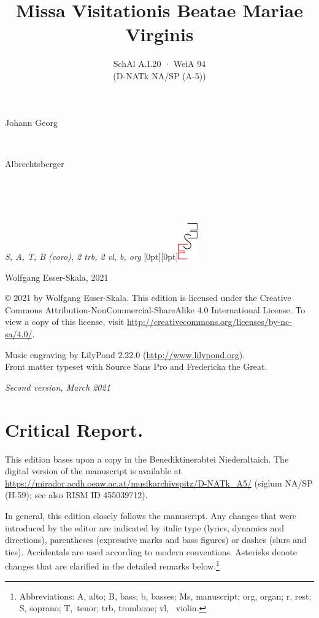 \documentclass[parskip=full]{scrreprt}
\makeatletter
\DeclareRobustCommand{\sbseries}{\fontseries{sb}\selectfont}
\newcommand\fancytitlehead{
	\headingfont%
	\fontsize{65}{65}\selectfont\textcolor{black!80}{\@ifundefined{@shortname}{\@lastname}{\@shortname}.}\\[15pt]%
	\fontsize{50}{50}\selectfont\@ifundefined{@shorttitle}{\@title}{\@shorttitle}.%
}
\def\firstname#1{\def\@firstname{#1}}
\def\lastname#1{\def\@lastname{#1}}
\def\shorttitle#1{\def\@shorttitle{#1}}
\def\instrumentation#1{\def\@instrumentation{#1}}
\def\maketitle{%
\begin{titlepage}%
	\Large%
	{\@titlehead}%
	\vfill%
	{\strut\@firstname}\\%
	{\sbseries\color{oldred}\strut\@lastname}\\%
	{\strut\@namesuffix}%
	\vfill%
	{\sbseries\@title}\\%
	{\@subtitle}\\[\baselineskip]%
	{\itshape\@instrumentation}%
	\vfill%
	{\itshape\@parts}\hspace*{\fill}\raisebox{0pt}[0pt][0pt]{\includegraphics{ees_logo}}%
\end{titlepage}%
}
\newif\ifprintreport\printreportfalse
\makeatother
\begin{document}
\frenchspacing

\titlehead{\fancytitlehead}
\firstname{Johann Georg}
\lastname{Albrechtsberger}
\title{Missa Visitationis Beatae Mariae Virginis}
\shorttitle{Missa Visitationis}
\subtitle{SchAl A.I.20 · WeiA 94\\(D-NATk NA/SP (A-5))}
\instrumentation{S, A, T, B (coro), 2 trb, 2 vl, b, org}
\maketitle


\thispagestyle{empty}

\vspace*{\fill}

\hspace*{1em}Wolfgang Esser-Skala, 2021

© 2021 by Wolfgang Esser-Skala. This edition is licensed under the Creative Commons Attribution-NonCommercial-ShareAlike 4.0 International License. To view a copy of this license, visit \url{http://creativecommons.org/licenses/by-nc-sa/4.0/}. 

Music engraving by LilyPond 2.22.0 (\url{http://www.lilypond.org}).\\
Front matter typeset with Source Sans Pro and Fredericka the Great.

\textit{Second version, March 2021}

\vspace*{2cm}

\ifprintreport
\chapter*{Critical Report.}

This edition bases upon a copy in the Benediktinerabtei Niederaltaich. The digital version of the manuscript is available at \url{https://mirador.acdh.oeaw.ac.at/musikarchivspitz/D-NATk_A5/} (siglum NA/SP (H-59); see also RISM ID 455039712).

In general, this edition closely follows the manuscript. Any changes that were introduced by the editor are indicated by italic type (lyrics, dynamics and directions), parentheses (expressive marks and bass figures) or dashes (slurs and ties). Accidentals are used according to modern conventions. Asterisks denote changes that are clarified in the detailed remarks below.\footnote{Abbreviations: A, alto; B, bass; b, basses; Ms, manuscript; org, organ; r, rest; S, soprano; T,~tenor; trb, trombone; vl,~ violin.}
\end{document}

